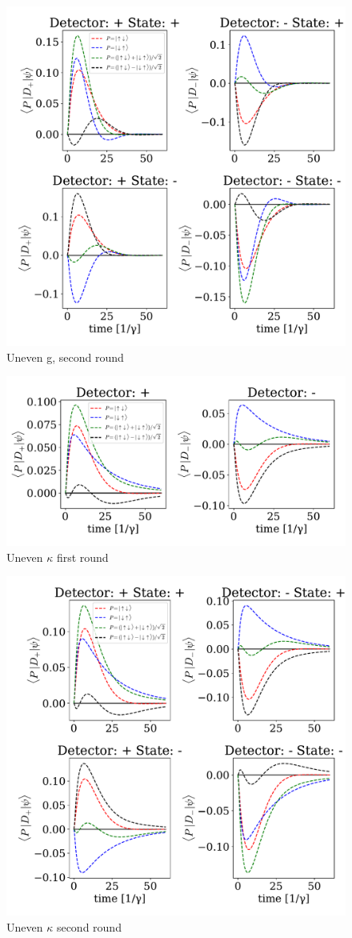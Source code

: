 \begin{figure}[H]
    \centering
    \includegraphics[width = 0.5 \linewidth]{figures/barett_uneven_g_second_detection.pdf}
    \caption{Uneven g, second round}
    \label{fig:my_label}
\end{figure}

\begin{figure}[H]
    \centering
    \includegraphics[width = 0.5 \linewidth]{figures/barett_uneven_kappa_first_detection.pdf}
    \caption{Uneven $\kappa$ first round}
    \label{fig:my_label}
\end{figure}

\begin{figure}[H]
    \centering
    \includegraphics[width = 0.5 \linewidth]{figures/barett_uneven_k_second_detection.pdf}
    \caption{Uneven $\kappa$ second round}
    \label{fig:my_label}
\end{figure}


